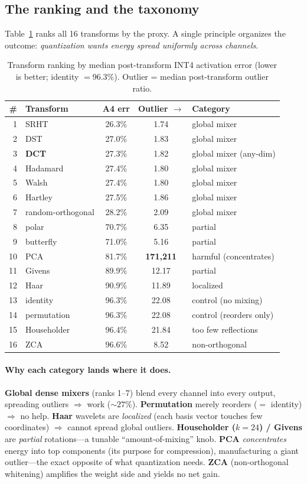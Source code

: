 \documentclass[conference]{IEEEtran}
\begin{document}
\subsection{The ranking and the taxonomy}
Table~\ref{tab:rank} ranks all 16 transforms by the proxy. A single principle organizes the
outcome: \emph{quantization wants energy spread uniformly across channels}.

\begin{table}[h]\centering
\caption{Transform ranking by median post-transform INT4 activation error (lower is better;
identity $=96.3\%$). Outlier = median post-transform outlier ratio.}
\label{tab:rank}
\begin{tabular}{rlccl}
\toprule
\# & Transform & A4 err & Outlier $\rightarrow$ & Category \\
\midrule
1 & SRHT & 26.3\% & 1.74 & global mixer \\
2 & DST & 27.0\% & 1.83 & global mixer \\
3 & \textbf{DCT} & 27.3\% & 1.82 & global mixer (any-dim) \\
4 & Hadamard & 27.4\% & 1.80 & global mixer \\
5 & Walsh & 27.4\% & 1.80 & global mixer \\
6 & Hartley & 27.5\% & 1.86 & global mixer \\
7 & random-orthogonal & 28.2\% & 2.09 & global mixer \\
8 & polar & 70.7\% & 6.35 & partial \\
9 & butterfly & 71.0\% & 5.16 & partial \\
10 & PCA & 81.7\% & \textbf{171{,}211} & harmful (concentrates) \\
11 & Givens & 89.9\% & 12.17 & partial \\
12 & Haar & 90.9\% & 11.89 & localized \\
13 & identity & 96.3\% & 22.08 & control (no mixing) \\
14 & permutation & 96.3\% & 22.08 & control (reorders only) \\
15 & Householder & 96.4\% & 21.84 & too few reflections \\
16 & ZCA & 96.6\% & 8.52 & non-orthogonal \\
\bottomrule
\end{tabular}
\end{table}

\paragraph{Why each category lands where it does.}
\textbf{Global dense mixers} (ranks 1--7) blend every channel into every output, spreading
outliers $\Rightarrow$ work ($\sim\!27\%$). \textbf{Permutation} merely reorders ($=$ identity)
$\Rightarrow$ no help. \textbf{Haar} wavelets are \emph{localized} (each basis vector touches
few coordinates) $\Rightarrow$ cannot spread global outliers. \textbf{Householder ($k\!=\!24$)
/ Givens} are \emph{partial} rotations---a tunable ``amount-of-mixing'' knob.
\textbf{PCA} \emph{concentrates} energy into top components (its purpose for compression),
manufacturing a giant outlier---the exact opposite of what quantization needs.
\textbf{ZCA} (non-orthogonal whitening) amplifies the weight side and yields no net gain.
\end{document}
